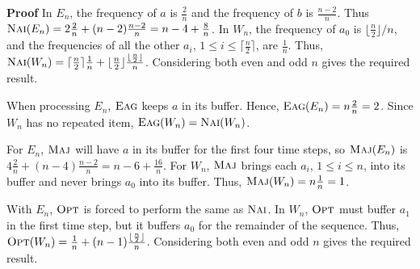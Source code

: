\documentclass[11pt]{article}
\newenvironment{proof}{\begin{trivlist}\item[]{\bf Proof }}{\hspace*{\fill}\raisebox{-1pt}{\boldmath$\Box$}\end{trivlist}}
\newcommand{\opt}{{\ensuremath{\textsc{Opt}}}\xspace}
\newcommand{\maj}{{\ensuremath{\textsc{Maj}}}\xspace}
\newcommand{\nav}{{\ensuremath{\textsc{Nai}}}\xspace}
\newcommand{\eag}{{\ensuremath{\textsc{Eag}}}\xspace}
\begin{document}
\begin{proof}
In $E_n$, the frequency of $a$ is $\frac{2}{n}$ and the frequency of $b$ is $\frac{n-2}{n}$.
Thus $\nav(E_n)= 2\frac{2}{n}+ (n-2)\frac{n-2}{n} = n-4+\frac{8}{n}$.
In $W_n$, the frequency of $a_0$ is $\lfloor\frac{n}{2}\rfloor/n$, and the frequencies of all the other $a_i$, $1\leq i \leq \lceil \frac{n}{2}\rceil$, are $\frac{1}{n}$. Thus, $\nav(W_n)= \lceil\frac{n}{2}\rceil\frac{1}{n} + \lfloor \frac{n}{2} \rfloor \frac{\lfloor\frac{n}{2}\rfloor}{n}$. Considering both even and odd $n$ gives the required result.

When processing $E_n$, \eag keeps $a$ in its buffer. Hence, $\eag(E_n)= n\frac{2}{n} = 2$.
Since $W_n$ has no repeated item, $\eag(W_n)=\nav(W_n)$.

For $E_n$, \maj will have $a$ in its buffer for the first four time steps, so $\maj(E_n)$ is $4\frac{2}{n}+(n-4)\frac{n-2}{n} = n-6+\frac{16}{n}$. For $W_n$, \maj brings each $a_i$, $1\leq i\leq n$, into its buffer and never brings $a_0$ into its buffer. Thus, $\maj(W_n) = n\frac{1}{n} = 1$.

With $E_n$, \opt is forced to perform the same as \nav.
In $W_n$, \opt must buffer $a_1$ in the first time step, but it buffers $a_0$ for the remainder of the sequence. Thus, $\opt(W_n) = \frac{1}{n}+(n-1)\frac{\lfloor \frac{n}{2}\rfloor}{n}$. Considering both even and odd $n$ gives the required result.
\end{proof}
\end{document}
